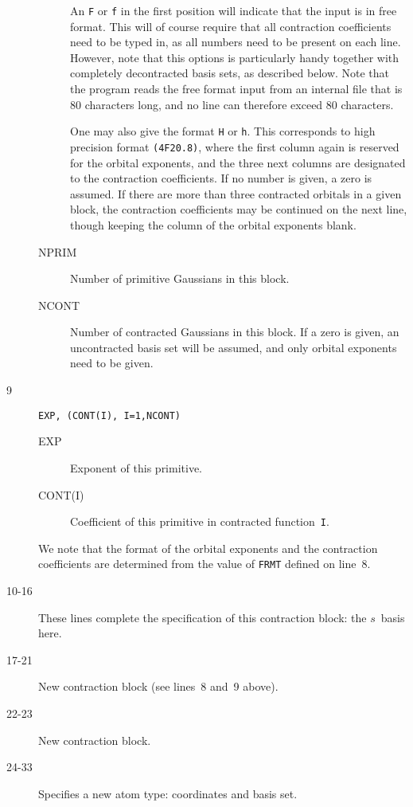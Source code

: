 \begin{description}
\begin{description}
An {\tt F} or {\tt f} in the first position will indicate that the
input is in free format. This will of course require that all
contraction coefficients need to be typed in, as all numbers need
to be present on each line. However, note that this options is
particularly handy together with completely decontracted basis
sets, as described below. Note that the program reads the free
format input from an internal file that is 80 characters long, and
no line can therefore exceed 80 characters.

One may also give the format {\tt H} or {\tt h}. This corresponds to
high precision format {\tt (4F20.8)}, where the first column again is
reserved for the orbital exponents, and the three next columns are
designated to the contraction coefficients. If no number is given, a zero
is assumed. If there are more than three contracted orbitals in a
given block, the contraction coefficients may be continued on the next
line, though keeping the column of the orbital exponents blank.

\item[NPRIM] Number of primitive
Gaussians in this block.
\item[NCONT] Number of contracted
Gaussians in this block. If a zero
is given, an uncontracted basis set will be assumed, and only orbital
exponents need to be given.
\end{description}
\item[9] \verb|EXP, (CONT(I), I=1,NCONT)|
\begin{description}
\item[EXP] Exponent of this primitive.
\item[CONT(I)] Coefficient of this primitive in contracted
function~{\tt I}.
\end{description}
We note that the format of the orbital exponents 
and the contraction
coefficients are determined from the value of {\tt FRMT} defined on
line~8.
\item[10-16] These lines complete the specification of this
contraction block: the $s$~basis here.
\item[17-21] New contraction block (see lines~8 and~9 above).
\item[22-23] New contraction block.
\item[24-33] Specifies a new atom type: coordinates and basis set.
\end{description}

